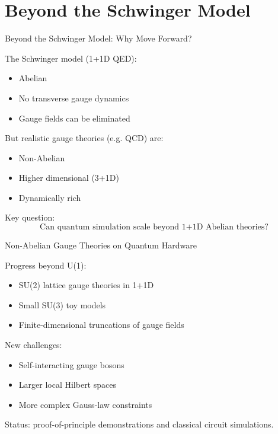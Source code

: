 \documentclass[11pt]{beamer}
\begin{document}
\section{Beyond the Schwinger Model}

\begin{frame}{Beyond the Schwinger Model: Why Move Forward?}

The Schwinger model (1+1D QED):

\begin{itemize}
\item Abelian
\item No transverse gauge dynamics
\item Gauge fields can be eliminated
\end{itemize}

But realistic gauge theories (e.g. QCD) are:

\begin{itemize}
\item Non-Abelian
\item Higher dimensional (3+1D)
\item Dynamically rich
\end{itemize}

Key question:
\[
\text{Can quantum simulation scale beyond 1+1D Abelian theories?}
\]
\end{frame}

\begin{frame}{Non-Abelian Gauge Theories on Quantum Hardware}

Progress beyond U(1):

\begin{itemize}
\item SU(2) lattice gauge theories in 1+1D
\item Small SU(3) toy models
\item Finite-dimensional truncations of gauge fields
\end{itemize}

New challenges:

\begin{itemize}
\item Self-interacting gauge bosons
\item Larger local Hilbert spaces
\item More complex Gauss-law constraints
\end{itemize}

Status: proof-of-principle demonstrations and classical circuit simulations.
\end{frame}
\end{document}
